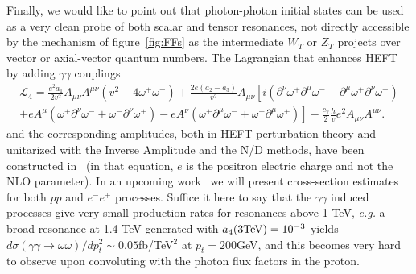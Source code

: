 \documentclass{PoS}
\newcommand{\mL}{\mathcal{L}}
\begin{document}
Finally, we would like to point out that photon-photon initial states can be used as a very clean probe of both scalar and tensor resonances, not directly accessible by the mechanism of figure~\ref{fig:FFs} as the intermediate $W_T$ or $Z_T$ projects over vector or axial-vector quantum numbers. 
The Lagrangian that enhances HEFT by adding $\gamma\gamma$ couplings
\begin{multline}
\mL_4 = %
\frac{e^2a_1}{2v^2}A_{\mu\nu}A^{\mu\nu}\left(v^2 - 4\omega^+\omega^-\right) %
 + \frac{2e(a_2-a_3)}{v^2}A_{\mu\nu}\left[%
         i\left(\partial^\nu\omega^+\partial^\mu\omega^- - \partial^\mu\omega^+\partial^\nu\omega^- \right) %
   \right. \\ \left. %
        +eA^\mu\left( \omega^+\partial^\nu\omega^- + \omega^-\partial^\nu\omega^+ \right)
        -eA^\nu\left( \omega^+\partial^\mu\omega^- + \omega^-\partial^\mu\omega^+ \right)
        \right] -\frac{c_{\gamma}}{2}\frac{h}{v}e^2 A_{\mu\nu} A^{\mu\nu} .
\end{multline}
and the corresponding amplitudes, both in HEFT perturbation theory and unitarized with the Inverse Amplitude and the N/D methods, have been constructed in~\cite{Delgado:2014jda} 
(in that equation, $e$ is the positron electric charge and not the NLO parameter). 
In an upcoming work~\cite{IvanMiguel} we will present cross-section estimates for both $pp$ and $e^-e^+$ processes. Suffice it here to say that the $\gamma\gamma$ induced processes give very small production rates for resonances above 1 TeV, {\it e.g.} a broad resonance at 1.4 TeV generated with $a_4(3{\rm TeV)}=10^{-3}$ yields
$d\sigma(\gamma\gamma\to \omega\omega)/dp_t^2\sim 0.05 $fb/TeV$ ^2$ at $p_t=200$GeV, and this becomes very hard to observe upon convoluting with the photon flux factors in the proton. 
\end{document}

